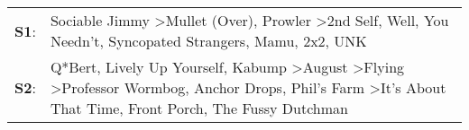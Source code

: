 \begin{supertabular}{p{0.03\textwidth}p{0.92\textwidth}}
 \textbf{S1}:  &                                                                                                                              Sociable Jimmy\textsuperscript{} \textgreater \enspace Mullet (Over)\textsuperscript{}, \enspace Prowler\textsuperscript{} \textgreater \enspace 2nd Self\textsuperscript{}, \enspace Well, You Needn't\textsuperscript{}, \enspace Syncopated Strangers\textsuperscript{}, \enspace Mamu\textsuperscript{}, \enspace 2x2\textsuperscript{}, \enspace UNK\textsuperscript{}  \enspace  \\
 \textbf{S2}:  &  Q*Bert\textsuperscript{}, \enspace Lively Up Yourself\textsuperscript{}, \enspace Kabump\textsuperscript{} \textgreater \enspace August\textsuperscript{} \textgreater \enspace Flying\textsuperscript{} \textgreater \enspace Professor Wormbog\textsuperscript{}, \enspace Anchor Drops\textsuperscript{}, \enspace Phil's Farm\textsuperscript{} \textgreater \enspace It's About That Time\textsuperscript{}, \enspace Front Porch\textsuperscript{}, \enspace The Fussy Dutchman\textsuperscript{}  \enspace  \\
\end{supertabular}
